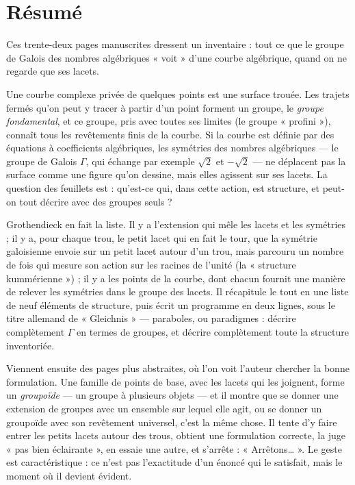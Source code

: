 \documentclass[11pt,a4paper]{article}
\begin{document}
\section*{Résumé}

\begin{resume}
Ces trente-deux pages manuscrites dressent un inventaire : tout ce que le
groupe de Galois des nombres algébriques « voit » d'une courbe algébrique,
quand on ne regarde que ses lacets.

Une courbe complexe privée de quelques points est une surface trouée. Les
trajets fermés qu'on peut y tracer à partir d'un point forment un groupe, le
\emph{groupe fondamental}, et ce groupe, pris avec toutes ses limites
(le groupe « profini »), connaît tous les revêtements finis de la courbe. Si la
courbe est définie par des équations à coefficients algébriques, les symétries
des nombres algébriques — le groupe de Galois $\Gamma$, qui échange par exemple
$\sqrt{2}$ et $-\sqrt{2}$ — ne déplacent pas la surface comme une figure qu'on
dessine, mais elles agissent sur ses lacets. La question des feuillets est :
qu'est-ce qui, dans cette action, est structure, et peut-on tout décrire
avec des groupes seuls ?

Grothendieck en fait la liste. Il y a l'extension qui mêle les lacets et les
symétries ; il y a, pour chaque trou, le petit lacet qui en fait le tour, que
la symétrie galoisienne envoie sur un petit lacet autour d'un trou, mais
parcouru un nombre de fois qui mesure son action sur les racines de l'unité
(la « structure kummérienne ») ; il y a les points de la courbe, dont chacun
fournit une manière de relever les symétries dans le groupe des lacets. Il
récapitule le tout en une liste de neuf éléments de structure, puis écrit un
programme en deux lignes, sous le titre allemand de « Gleichnis » —
paraboles, ou paradigmes : décrire complètement $\Gamma$ en termes de groupes,
et décrire complètement toute la structure inventoriée.

Viennent ensuite des pages plus abstraites, où l'on voit l'auteur chercher la
bonne formulation. Une famille de points de base, avec les lacets qui les
joignent, forme un \emph{groupoïde} — un groupe à plusieurs objets — et il
montre que se donner une extension de groupes avec un ensemble sur lequel elle
agit, ou se donner un groupoïde avec son revêtement universel, c'est la même
chose. Il tente d'y faire entrer les petits lacets autour des trous, obtient
une formulation correcte, la juge « pas bien éclairante », en essaie une autre,
et s'arrête : « Arrêtons… ». Le geste est caractéristique : ce n'est pas
l'exactitude d'un énoncé qui le satisfait, mais le moment où il devient
évident.


\end{resume}
\end{document}
